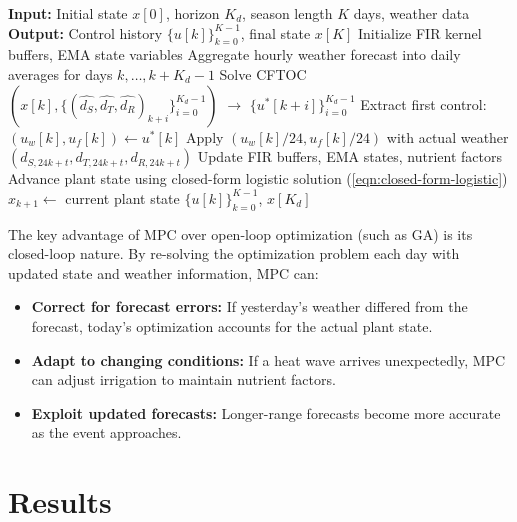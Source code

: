 \documentclass[preprint,12pt]{elsarticle}
\begin{document}
\begin{algorithm}[!htbp]
\caption{Model Predictive Control for Irrigation and Fertilization}
\label{alg:mpc}
\begin{algorithmic}[1]
\State \textbf{Input:} Initial state $x[0]$, horizon $K_{d}$, season length $K$ days, weather data
\State \textbf{Output:} Control history $\{u[k]\}_{k=0}^{K-1}$, final state $x[K]$
\State
\State Initialize FIR kernel buffers, EMA state variables
    \State Aggregate hourly weather forecast into daily averages for days $k, \ldots, k+K_{d}-1$
    \State Solve CFTOC$(x[k], \{(\hat{d_{S}}, \hat{d_{T}}, \hat{d_{R}})_{k+i}\}_{i=0}^{K_{d}-1})$ $\rightarrow$ $\{u^*[k+i]\}_{i=0}^{K_{d}-1}$
    \State Extract first control: $(u_{w}[k], u_{f}[k]) \leftarrow u^*[k]$
     
        \State Apply $(u_{w}[k]/24, u_{f}[k]/24)$ with actual weather $(d_{S, 24k+t}, d_{T, 24k+t}, d_{R, 24k+t})$
        \State Update FIR buffers, EMA states, nutrient factors
        \State Advance plant state using closed-form logistic solution (\ref{eqn:closed-form-logistic})
    \EndFor
    \State $x_{k+1} \leftarrow$ current plant state
\EndFor
\State \Return $\{u[k]\}_{k=0}^{K-1}$, $x[K_{d}]$
\end{algorithmic}
\end{algorithm}

The key advantage of MPC over open-loop optimization (such as GA) is its closed-loop nature. By re-solving the optimization problem each day with updated state and weather information, MPC can:
\begin{itemize}
\item \textbf{Correct for forecast errors:} If yesterday's weather differed from the forecast, today's optimization accounts for the actual plant state.
\item \textbf{Adapt to changing conditions:} If a heat wave arrives unexpectedly, MPC can adjust irrigation to maintain nutrient factors.
\item \textbf{Exploit updated forecasts:} Longer-range forecasts become more accurate as the event approaches.
\end{itemize}

\section{Results}\label{sec:results}
\end{document}
